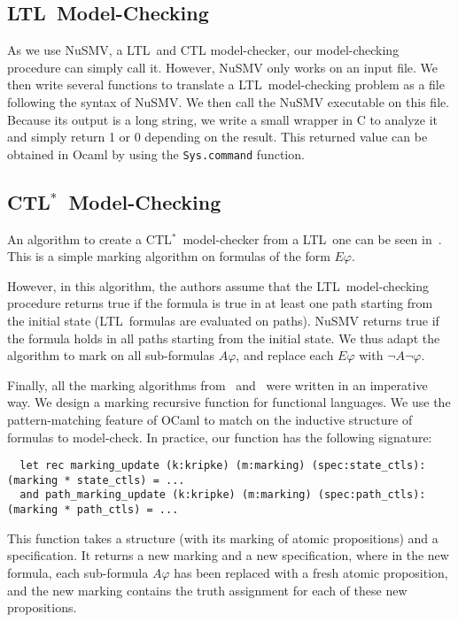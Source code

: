 \documentclass[dvipsnames]{acmart}
\def\ctls{CTL$^{*}$}
\def\ltl{LTL}
\def\A{\mathit{A}}
\def\E{\mathit{E}}
\begin{document}
\subsection{\ltl\ Model-Checking}
As we use NuSMV, a \ltl\ and CTL model-checker, our model-checking procedure can simply call it.
However, NuSMV only works on an input file. We then write several functions to translate a \ltl\ model-checking problem as a file following the syntax of NuSMV.
We then call the NuSMV executable on this file. Because its output is a long string, we write a small wrapper in C to analyze it and simply return 1 or 0 depending on the result. This returned value can be obtained in Ocaml by using the \lstinline{Sys.command} function.

\subsection{\ctls\ Model-Checking}
An algorithm to create a \ctls\ model-checker from a \ltl\ one can be seen in~\cite{reduction}.
This is a simple marking algorithm on formulas of the form $\E\varphi$.

However, in this algorithm, the authors assume that the \ltl\ model-checking procedure returns true if the formula is true in at least one path starting from the initial state (\ltl\ formulas are evaluated on paths).
NuSMV returns true if the formula holds in all paths starting from the initial state.
We thus adapt the algorithm to mark on all sub-formulas $\A\varphi$, and replace each $\E\varphi$ with $\neg\A\neg\varphi$.

Finally, all the marking algorithms from~\cite{reduction} and~\cite{internship} were written in an imperative way.
We design a marking recursive function for functional languages.
We use the pattern-matching feature of OCaml to match on the inductive structure of formulas to model-check.
In practice, our function has the following signature:

\begin{lstlisting}
  let rec marking_update (k:kripke) (m:marking) (spec:state_ctls): (marking * state_ctls) = ...
  and path_marking_update (k:kripke) (m:marking) (spec:path_ctls): (marking * path_ctls) = ...
\end{lstlisting}

This function takes a structure (with its marking of atomic propositions) and a specification. It returns a new marking and a new specification, where in the new formula, each sub-formula $\A\varphi$ has been replaced with a fresh atomic proposition, and the new marking contains the truth assignment for each of these new propositions.
\end{document}
